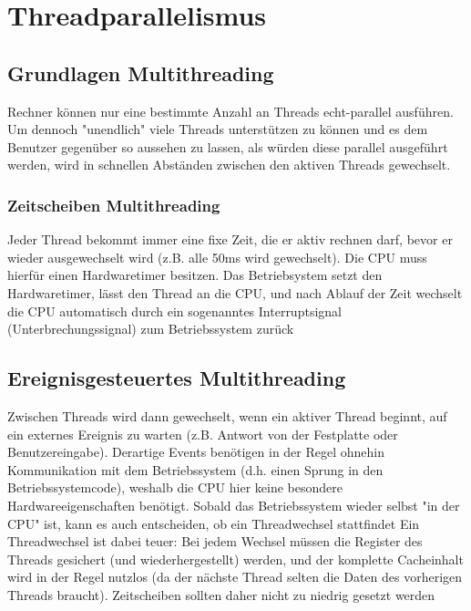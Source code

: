 \section{Threadparallelismus}
	\subsection{Grundlagen Multithreading}
		Rechner können nur eine bestimmte Anzahl an Threads echt-parallel ausführen. Um dennoch "unendlich" viele Threads unterstützen zu können und es dem Benutzer gegenüber so aussehen zu lassen, als würden diese parallel ausgeführt werden, wird in schnellen Abständen zwischen den aktiven Threads gewechselt.
		\subsubsection{Zeitscheiben Multithreading}
			Jeder Thread bekommt immer eine fixe Zeit, die er aktiv rechnen darf, bevor er wieder ausgewechselt wird (z.B. alle 50ms wird gewechselt). Die CPU muss hierfür einen Hardwaretimer besitzen. Das Betriebsystem setzt den Hardwaretimer, lässt den Thread an die CPU, und nach Ablauf der Zeit wechselt die CPU automatisch durch ein sogenanntes Interruptsignal (Unterbrechungssignal) zum Betriebssystem zurück
		\subsection{Ereignisgesteuertes Multithreading}
			Zwischen Threads wird dann gewechselt, wenn ein aktiver Thread beginnt, auf ein externes Ereignis zu warten (z.B. Antwort von der Festplatte oder Benutzereingabe). Derartige Events benötigen in der Regel ohnehin Kommunikation mit dem Betriebssystem (d.h. einen Sprung in den Betriebssystemcode), weshalb die CPU hier keine besondere Hardwareeigenschaften benötigt. Sobald das Betriebssystem wieder selbst "in der CPU" ist, kann es auch entscheiden, ob ein Threadwechsel stattfindet \newline \newline
			Ein Threadwechsel ist dabei teuer: Bei jedem Wechsel müssen die Register des Threads gesichert (und wiederhergestellt) werden, und der komplette Cacheinhalt wird in der Regel nutzlos (da der nächste Thread selten die Daten des vorherigen Threads braucht). Zeitscheiben sollten daher nicht zu niedrig gesetzt werden
